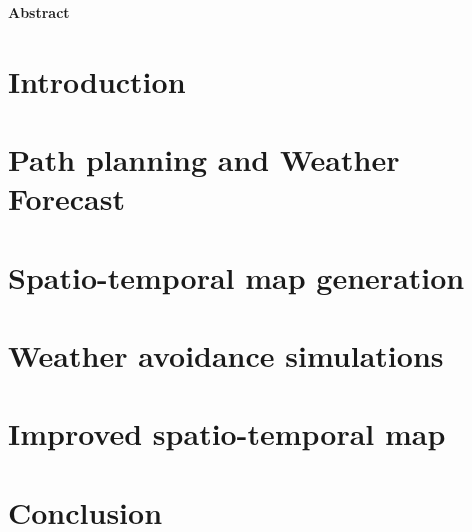 \documentclass[12pt,a4paper,twoside, openright]{book}
\begin{document}
\begin{flushleft}
	\textbf{\Large{Abstract}}
\end{flushleft}



{\tableofcontents
\let\cleardoublepage\clearpage 
\listoffigures
\let\cleardoublepage\clearpage 
\listoftables}


\mainmatter
\pagestyle{fancy}
\chapter{Introduction}


\chapter{Path planning and Weather Forecast}





\chapter{Spatio-temporal map generation}



\chapter{Weather avoidance simulations}


\chapter{Improved spatio-temporal map}


\chapter{Conclusion}

\end{document}
